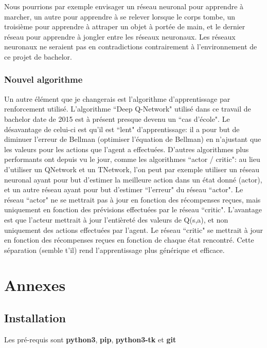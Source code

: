 \documentclass[11pt,a4paper]{report}
\begin{document}
   \par Nous pourrions par exemple envisager un réseau neuronal pour apprendre à marcher, un autre pour apprendre à se relever lorsque le corps tombe, un troisième pour apprendre à attraper un objet à portée de main, et le dernier réseau pour apprendre à jongler entre les réseaux neuronaux. Les réseaux neuronaux ne seraient pas en contradictions contrairement à l'environnement de ce projet de bachelor. 
   
  \subsection{Nouvel algorithme}
  
  \par Un autre élément que je changerais est l'algorithme d'apprentissage par renforcement utilisé. L'algorithme ``Deep Q-Network" utilisé dans ce travail de bachelor date de 2015 est à présent presque devenu un ``cas d'école". Le désavantage de celui-ci est qu'il est ``lent" d'apprentissage: il a pour but de diminuer l'erreur de Bellman (optimiser l'équation de Bellman) en n'ajustant que les valeurs pour les actions que l'agent a effectuées. D'autres algorithmes plus performants ont depuis vu le jour, comme les algorithmes ``actor / critic": au lieu d'utiliser un QNetwork et un TNetwork, l'on peut par exemple utiliser un réseau neuronal ayant pour but d'estimer la meilleure action dans un état donné (actor), et un autre réseau ayant pour but d'estimer ``l'erreur" du réseau ``actor". Le réseau ``actor" ne se mettrait pas à jour en fonction des récompenses reçues, mais uniquement en fonction des prévisions effectuées par le réseau ``critic". L'avantage est que l'acteur mettrait à jour l’entièreté des valeurs de Q(s,a), et non uniquement des actions effectuées par l'agent. Le réseau ``critic" se mettrait à jour en fonction des récompenses reçues en fonction de chaque état rencontré. Cette séparation (semble t'il) rend l'apprentissage plus générique et efficace. 
  
  \chapter{Annexes}
  
  \section{Installation}
  
  \par Les pré-requis sont \textbf{python3}, \textbf{pip}, \textbf{python3-tk} et \textbf{git}
  
\end{document}
